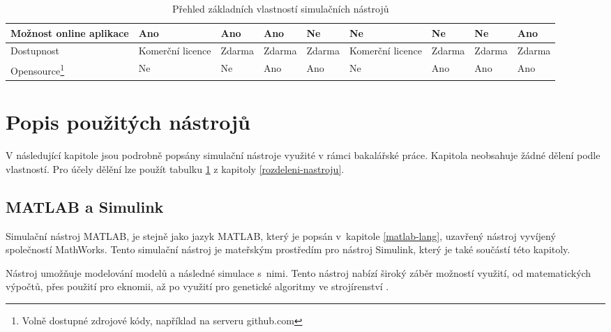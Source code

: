 \begin{savenotes}
\begin{table}[]
{\begin{tabular}{|l|l|l|l|l|l|l|l|l|}
Možnost online aplikace                                                                                     & Ano                                                                                                             & Ano        & Ano    & Ne      & Ne               & Ne                                                       & Ne        & Ano            \\ \hline
Dostupnost                                                                                          & Komerční licence & Zdarma     & Zdarma & Zdarma  & Komerční licence & Zdarma                                                   & Zdarma    & Zdarma         \\ \hline
Opensource\footnote{Volně dostupné zdrojové kódy, například na serveru github.com} & Ne                                                                                                              & Ne         & Ano    & Ano     & Ne               & Ano                                                      & Ano        & Ano            \\ \hline
\end{tabular}%
}
\caption{Přehled základních vlastností simulačních nástrojů}
\label{tab:rozdeleni-nastroju}
\end{table}
\end{savenotes}



\section{Popis použitých nástrojů}
\label{popis-nastroju}
V následující kapitole jsou podrobně popsány simulační nástroje využité v rámci bakalářské práce. Kapitola neobsahuje žádné dělení podle vlastností. Pro účely dělění lze použít tabulku \ref{tab:rozdeleni-nastroju} z kapitoly \ref{rozdeleni-nastroju}.
\subsection{MATLAB a Simulink}
\label{matlab-desc}

Simulační nástroj MATLAB, je stejně jako jazyk MATLAB, který je popsán v~kapitole \ref{matlab-lang}, uzavřený nástroj vyvíjený společností MathWorks. Tento simulační nástroj je mateřským prostředím pro nástroj Simulink, který je také součástí této kapitoly.

Nástroj umožňuje modelování modelů a následné simulace s~nimi. Tento nástroj nabízí široký záběr možností využití, od matematických výpočtů, přes použití pro eknomii, až po využití pro genetické algoritmy ve strojírenství \cite{Zapletal2016}.

